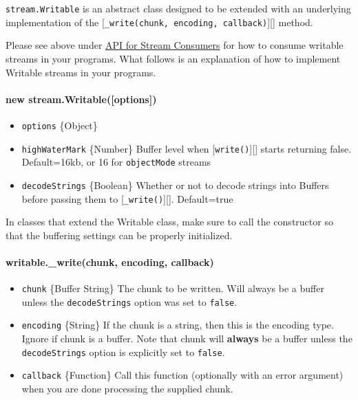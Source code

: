 \texttt{stream.Writable} is an abstract class designed to be extended
with an underlying implementation of the
{[}\texttt{\_write(chunk, encoding, callback)}{]}{[}{]} method.

Please see above under
\hyperref[stream\_api\_for\_stream\_consumers]{API for Stream Consumers}
for how to consume writable streams in your programs. What follows is an
explanation of how to implement Writable streams in your programs.

\paragraph{new stream.Writable({[}options{]})}

\begin{itemize}
\item
  \texttt{options} \{Object\}
\item
  \texttt{highWaterMark} \{Number\} Buffer level when
  {[}\texttt{write()}{]}{[}{]} starts returning false. Default=16kb, or
  16 for \texttt{objectMode} streams
\item
  \texttt{decodeStrings} \{Boolean\} Whether or not to decode strings
  into Buffers before passing them to {[}\texttt{\_write()}{]}{[}{]}.
  Default=true
\end{itemize}

In classes that extend the Writable class, make sure to call the
constructor so that the buffering settings can be properly initialized.

\paragraph{writable.\_write(chunk, encoding, callback)}

\begin{itemize}
\item
  \texttt{chunk} \{Buffer \textbar{} String\} The chunk to be written.
  Will always be a buffer unless the \texttt{decodeStrings} option was
  set to \texttt{false}.
\item
  \texttt{encoding} \{String\} If the chunk is a string, then this is
  the encoding type. Ignore if chunk is a buffer. Note that chunk will
  \textbf{always} be a buffer unless the \texttt{decodeStrings} option
  is explicitly set to \texttt{false}.
\item
  \texttt{callback} \{Function\} Call this function (optionally with an
  error argument) when you are done processing the supplied chunk.
\end{itemize}

